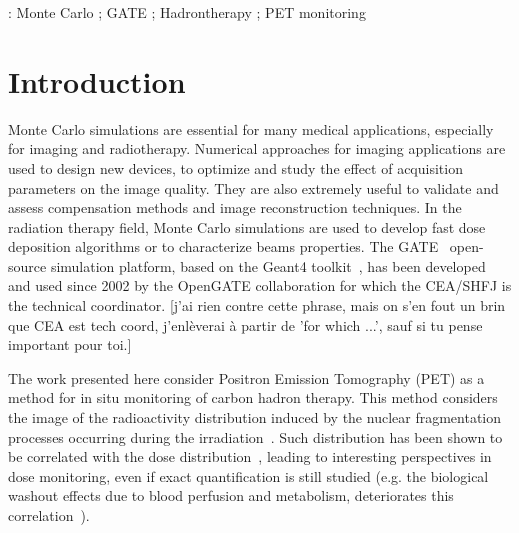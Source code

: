 \documentclass[11pt]{iopart}
\newcommand{\dsnote}[1]{{\color{green}[#1]}}
\begin{document}
\vspace{2pc}
: Monte Carlo ; GATE ; Hadrontherapy ; PET monitoring
\maketitle


\section{Introduction}

Monte Carlo simulations are essential for many medical applications,
especially for imaging and radiotherapy. Numerical approaches for
imaging applications are used to design new devices, to optimize and
study the effect of acquisition parameters on the image quality. They
are also extremely useful to validate and assess compensation methods
and image reconstruction techniques. In the radiation therapy field,
Monte Carlo simulations are used to develop fast dose deposition
algorithms or to characterize beams properties. The
GATE~\cite{Jan2004, Jan2011} open-source simulation platform, based on
the Geant4 toolkit~\cite{Allison2006, Agostinelli2003}, has been
developed and used since 2002 by the OpenGATE collaboration for which
the CEA/SHFJ is the technical coordinator.  \dsnote{j'ai rien contre
  cette phrase, mais on s'en fout un brin que CEA est tech coord,
  j'enlèverai à partir de 'for which ...', sauf si tu pense important
  pour toi.}

The work presented here consider Positron Emission Tomography (PET) as
a method for in situ monitoring of carbon hadron therapy. This method
considers the image of the radioactivity distribution induced by the
nuclear fragmentation processes occurring during the
irradiation~\cite{Enghardt1999}. Such distribution has been shown to
be correlated with the dose distribution~\cite{Moteabbed2011}, leading
to interesting perspectives in dose monitoring, even if exact
quantification is still studied (e.g. the biological washout effects
due to blood perfusion and metabolism, deteriorates this
correlation~\cite{Parodi2008}).
\end{document}

